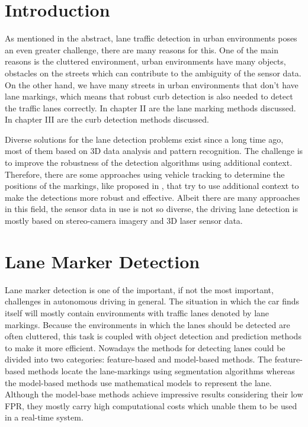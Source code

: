 \chapter{Introduction}

As mentioned in the abstract, lane traffic detection in urban environments poses an even greater challenge, there are many reasons for this. One of the main reasons is the cluttered environment, urban environments have many objects, obstacles on the streets which can contribute to the ambiguity of the sensor data. On the other hand, we have many streets in urban environments that don't have lane markings, which means that robust curb detection is also needed to detect the traffic lanes correctly. In chapter II are the lane marking methods discussed. In chapter III are the curb detection methods discussed. 


Diverse solutions for the lane detection problems exist since a long time ago, most of them based on 3D data analysis and pattern recognition. The challenge is to improve the robustness of the detection algorithms using additional context. Therefore, there are some approaches using vehicle tracking to determine the positions of the markings, like proposed in \cite{virtuallane}, that try to use additional context to make the detections more robust and effective. Albeit there are many approaches in this field, the sensor data in use is not so diverse, the driving lane detection is mostly based on stereo-camera imagery and 3D laser sensor data.


\chapter{Lane Marker Detection}

Lane marker detection is one of the important, if not the most important, challenges in autonomous driving in general. The situation in which the car finds itself will mostly contain environments with traffic lanes denoted by lane markings. Because the environments in which the lanes should be detected are often cluttered, this task is coupled with object detection and prediction methods to make it more efficient. Nowadays the methods for detecting lanes could be divided into two categories: feature-based and model-based methods. The feature-based methods locate the lane-markings using segmentation algorithms whereas the model-based methods use mathematical models to represent the lane. Although the model-base methods achieve impressive results considering their low FPR, they mostly carry high computational costs which unable them to be used in a real-time system.

